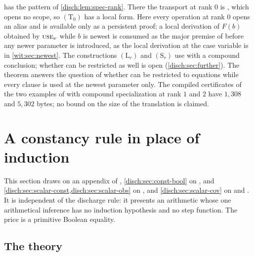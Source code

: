\begin{remark}
\label{disch:rem:alias-atomic}
 has the pattern of \cref{disch:lem:spec-rank}.
There the transport at rank $0$ is , which opens no scope,
so $(\mathrm T_0)$ has a local form. Here every operation at rank $0$ opens
an alias and is available only as a persistent proof; a local derivation of
$F(b)$ obtained by $\rulename{Use}_{\nu}$ while $b$ is newest is consumed
as the major premise of  before any newer parameter is
introduced, as the local derivation at the case variable is in
\cref{wit:sec:newest}. The constructions $(\mathrm L_r)$ and
$(\mathrm S_r)$ use  with a compound conclusion; whether
 can be restricted as well is open
(\cref{disch:sec:further}). The theorem answers the question of
 whether  can be restricted to equations
while every clause is used at the newest parameter only. The compiled
certificates of the two examples of  with compound
specialization at rank $1$ and $2$ have $1{,}308$ and $5{,}302$ bytes; no
bound on the size of the translation is claimed.
\end{remark}

\section{A constancy rule in place of induction}
\label{disch:sec:const}

This section draws on an appendix of ,
\cref{disch:sec:const-bool} on , and
\cref{disch:sec:scalar-const,disch:sec:scalar-obs} on
, and \cref{disch:sec:scalar-cov} on
 and . It is
independent of the discharge rule: it presents an arithmetic whose one
arithmetical inference has no induction hypothesis and no step function.
The price is a primitive Boolean equality.

\subsection{The theory}

